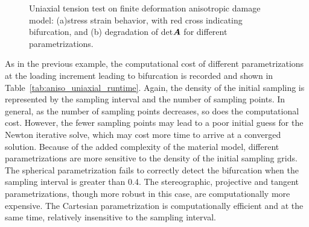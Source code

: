 \documentclass[12pt]{article}
\numberwithin{equation}{section}
\begin{document}
\begin{figure}[H]
  \centering {} 
  \caption{Uniaxial tension test on finite deformation 
  anisotropic damage model: 
  (a)stress strain behavior, with red cross indicating bifurcation, and
  (b) degradation of det${\boldsymbol{A}}$ for different
  parametrizations.}
  \label{fig:aniso_stress_stretch}
\end{figure}

As in the previous example, the computational cost of different 
parametrizations at the loading increment leading to bifurcation is 
recorded and shown in Table~\ref{tab:aniso_uniaxial_runtime}. Again, 
the density of the initial sampling is represented by the sampling 
interval and the number of sampling points. In general, as the number 
of sampling points decreases, so does the computational cost. However, 
the fewer sampling points may lead to a poor initial guess for the 
Newton iterative solve, which may cost more time to arrive at a 
converged solution. Because of the added complexity of the material 
model, different parametrizations are more sensitive to the density of 
the initial sampling grids. The spherical parametrization fails to 
correctly detect the bifurcation when the sampling interval is greater 
than 0.4. The stereographic, projective and tangent parametrizations, 
though more robust in this case, are computationally more expensive. 
The Cartesian parametrization is computationally efficient and at the 
same time, relatively insensitive to the sampling interval. 
\end{document}
